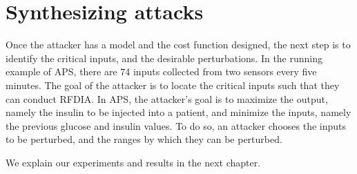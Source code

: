 \section{Synthesizing attacks}
Once the attacker has a model and the cost function designed, the next step is to identify the critical inputs, and the desirable perturbations.
In the running example of APS, there are 74 inputs collected from two sensors every five minutes.
 The goal of the attacker is to locate the critical inputs such that they can conduct \ac{RFDIA}.
 In \ac{APS}, the attacker's goal is to maximize the output, namely the insulin to be injected into a patient, and minimize the inputs, namely the previous glucose and insulin values. 
 To do so, an attacker chooses the inputs to be perturbed, and the ranges by which they can be perturbed.  
  
 
We explain our experiments and results in the next chapter. 

